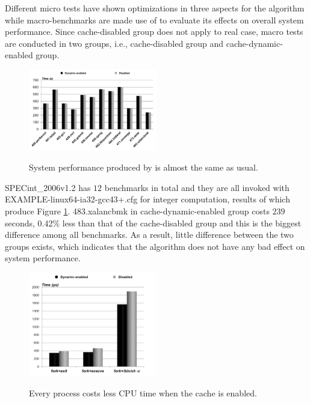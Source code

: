 Different micro tests have shown optimizations in three aspects for the algorithm while macro-benchmarks are made use of to evaluate its effects on overall system performance. Since cache-disabled group does not apply to real case, macro tests are conducted in two groups, i.e., cache-disabled group and cache-dynamic-enabled group.

\begin{figure}[htp]
\centering
\includegraphics[width=0.5\textwidth]{image/macro/spec.png} \\
\caption{System performance produced by \name is almost the same as usual.}
\label{fig:spec}
\end{figure}

SPECint\_2006v1.2 has $12$ benchmarks in total and they are all invoked with EXAMPLE-linux64-ia32-gcc43+.cfg for integer computation, results of which produce Figure \ref{fig:spec}. 483.xalancbmk in cache-dynamic-enabled group costs $239$ seconds, 0.42\% less
than that of the cache-disabled group and this is the biggest difference among all benchmarks. As a result, little difference between the two groups exists, which indicates that the algorithm does not have any bad effect on system performance.

\begin{figure}[htp]
\centering
\includegraphics[width=0.5\textwidth]{image/macro/lmbench.png} \\
\caption{Every process costs less CPU time when the cache is enabled.}
\label{fig:lmbench}
\end{figure}

